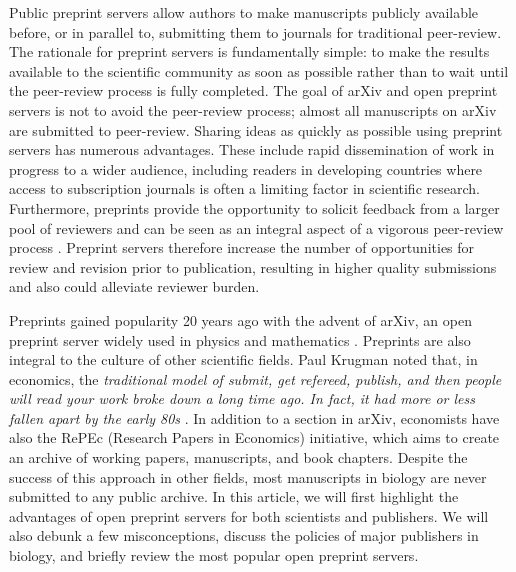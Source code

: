 \documentclass[letterpaper,twocolumn,superscriptaddress,showkeys]{revtex4}
\begin{document}
Public preprint servers allow authors to make manuscripts publicly
available before, or in parallel to, submitting them to journals for
traditional peer-review. The rationale for preprint servers is
fundamentally simple: to make the results available to the scientific
community as soon as possible rather than to wait until the
peer-review process is fully completed. The goal of arXiv and open
preprint servers is not to avoid the peer-review process; almost all
manuscripts on arXiv are submitted to peer-review.  Sharing ideas as
quickly as possible using preprint servers has numerous advantages.
These include rapid dissemination of work in progress to a wider
audience, including readers in developing countries where access to
subscription journals is often a limiting factor in scientific
research.  Furthermore, preprints provide the opportunity to solicit
feedback from a larger pool of reviewers and can be seen as an
integral aspect of a vigorous peer-review process \cite{hoc12}.
Preprint servers therefore increase the number of opportunities for
review and revision prior to publication, resulting in higher quality
submissions and also could alleviate reviewer burden.

Preprints gained popularity 20 years ago with the advent of arXiv, an
open preprint server widely used in physics and mathematics
\cite{gin11}. Preprints are also integral to the culture of other
scientific fields.  Paul Krugman noted that, in economics, the
\emph{traditional model of submit, get refereed, publish, and then
  people will read your work broke down a long time ago. In fact, it
  had more or less fallen apart by the early 80s} \cite{kru12}. In
addition to a section in arXiv, economists have also the RePEc
(Research Papers in Economics) initiative, which aims to create an
archive of working papers, manuscripts, and book chapters.  Despite
the success of this approach in other fields, most manuscripts in
biology are never submitted to any public archive.
In this article, we will first highlight the advantages of open
preprint servers for both scientists and publishers. We will also
debunk a few misconceptions, discuss the policies of major publishers
in biology, and briefly review the most popular open preprint servers.
\end{document}
